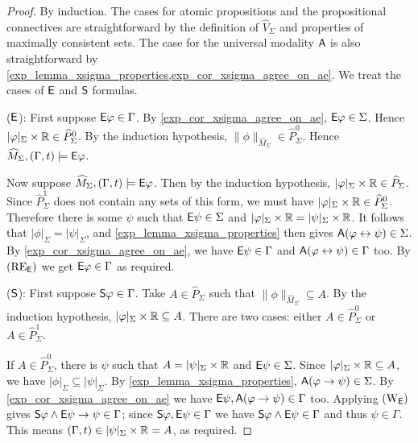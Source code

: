\begin{proof}
    By induction. The cases for atomic propositions and
    the propositional connectives are straightforward by the definition of
    $\widehat{V}_\Sigma$ and properties of
    maximally consistent sets. The case for the universal modality $\A$ is also
    straightforward by \cref{exp_lemma_xsigma_properties,exp_cor_xsigma_agree_on_ae}.
    We treat the cases of $\E$ and $\S$
    formulas.

    ($\E$): First suppose $\E\phi \in \Gamma$. By
    \cref{exp_cor_xsigma_agree_on_ae}, $\E\phi \in \Sigma$. Hence $|\phi|_\Sigma
    \times \R \in \widehat{P}_\Sigma^0$. By the induction hypothesis,
    $\|\phi\|_{\widehat{M}_\Sigma} \in \widehat{P}_\Sigma^0$. Hence
    $\widehat{M}_\Sigma, (\Gamma, t) \models \E\phi$.

    Now suppose $\widehat{M}_\Sigma, (\Gamma, t) \models \E\phi$.  Then by the
    induction hypothesis, $|\phi|_\Sigma \times \R \in \widehat{P}_\Sigma$.
    Since $\widehat{P}_\Sigma^1$ does not contain any sets of this form, we
    must have $|\phi|_\Sigma \times \R \in \widehat{P}_\Sigma^0$. Therefore
    there is some $\psi$ such that $\E\psi \in \Sigma$ and $|\phi|_\Sigma
    \times \R = |\psi|_\Sigma \times \R$.  It follows that $|\phi|_\Sigma =
    |\psi|_\Sigma$, and \cref{exp_lemma_xsigma_properties} then gives $\A(\phi
    \liff \psi) \in \Sigma$. By \cref{exp_cor_xsigma_agree_on_ae}, we have $\E\psi
    \in \Gamma$ and $\A(\phi \liff \psi) \in \Gamma$ too. By $\reE$ we get
    $\E\phi \in \Gamma$ as required.

    ($\S$): First suppose $\S\phi \in \Gamma$. Take $A \in \widehat{P}_\Sigma$
    such that $\|\phi\|_{\widehat{M}_\Sigma} \subseteq A$. By the induction
    hypothesis, $|\phi|_\Sigma \times \R \subseteq A$. There are two cases:
    either $A \in \widehat{P}_\Sigma^0$ or $A \in \widehat{P}_\Sigma^1$.

    If $A \in \widehat{P}_\Sigma^0$, there is $\psi$ such that $A =
    |\psi|_\Sigma \times \R$ and $\E\psi \in \Sigma$.  Since $|\phi|_\Sigma
    \times \R \subseteq A$, we have $|\phi|_\Sigma \subseteq |\psi|_\Sigma$.
    By \cref{exp_lemma_xsigma_properties}, $\A(\phi \limplies \psi) \in \Sigma$. By
    \cref{exp_cor_xsigma_agree_on_ae} we have $\E\psi, \A(\phi \limplies \psi) \in
    \Gamma$ too. Applying $\weakeningE$ gives $\S\phi \land \E\psi \limplies
    \psi \in \Gamma$; since $\S\phi, \E\psi \in \Gamma$ we have $\S\phi \land
    \E\psi \in \Gamma$ and thus $\psi \in \Gamma$. This means $(\Gamma, t) \in
    |\psi|_\Sigma \times \R = A$, as required.


\end{proof}
